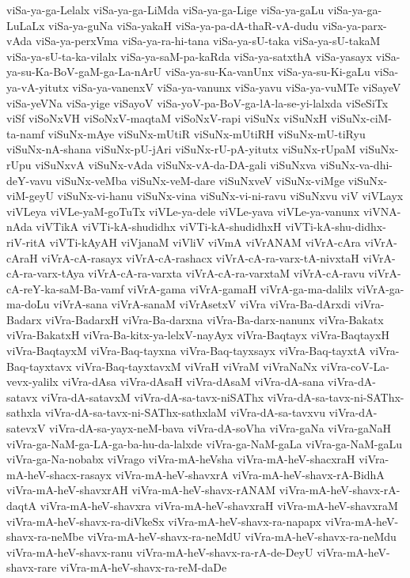 {viSa-ya-ga-Lelalx
viSa-ya-ga-LiMda
viSa-ya-ga-Lige
viSa-ya-gaLu
viSa-ya-ga-LuLaLx
viSa-ya-guNa
viSa-yakaH
viSa-ya-pa-dA-thaR-vA-dudu
viSa-ya-parx-vAda
viSa-ya-perxVma
viSa-ya-ra-hi-tana
viSa-ya-sU-taka
viSa-ya-sU-takaM
viSa-ya-sU-ta-ka-vilalx
viSa-ya-saM-pa-kaRda
viSa-ya-satxthA
viSa-yasayx
viSa-ya-su-Ka-BoV-gaM-ga-La-nArU
viSa-ya-su-Ka-vanUnx
viSa-ya-su-Ki-gaLu
viSa-ya-vA-yitutx
viSa-ya-vanenxV
viSa-ya-vanunx
viSa-yavu
viSa-ya-vuMTe
viSayeV
viSa-yeVNa
viSa-yige
viSayoV
viSa-yoV-pa-BoV-ga-lA-la-se-yi-lalxda
viSeSiTx
viSf
viSoNxVH
viSoNxV-maqtaM
viSoNxV-rapi
viSuNx
viSuNxH
viSuNx-ciM-ta-namf
viSuNx-mAye
viSuNx-mUtiR
viSuNx-mUtiRH
viSuNx-mU-tiRyu
viSuNx-nA-shana
viSuNx-pU-jAri
viSuNx-rU-pA-yitutx
viSuNx-rUpaM
viSuNx-rUpu
viSuNxvA
viSuNx-vAda
viSuNx-vA-da-DA-gali
viSuNxva
viSuNx-va-dhi-deY-vavu
viSuNx-veMba
viSuNx-veM-dare
viSuNxveV
viSuNx-viMge
viSuNx-viM-geyU
viSuNx-vi-hanu
viSuNx-vina
viSuNx-vi-ni-ravu
viSuNxvu
viV
viVLayx
viVLeya
viVLe-yaM-goTuTx
viVLe-ya-dele
viVLe-yava
viVLe-ya-vanunx
viVNA-nAda
viVTikA
viVTi-kA-shudidhx
viVTi-kA-shudidhxH
viVTi-kA-shu-didhx-riV-ritA
viVTi-kAyAH
viVjanaM
viVliV
viVmA
viVrANAM
viVrA-cAra
viVrA-cAraH
viVrA-cA-rasayx
viVrA-cA-rashacx
viVrA-cA-ra-varx-tA-nivxtaH
viVrA-cA-ra-varx-tAya
viVrA-cA-ra-varxta
viVrA-cA-ra-varxtaM
viVrA-cA-ravu
viVrA-cA-reY-ka-saM-Ba-vamf
viVrA-gama
viVrA-gamaH
viVrA-ga-ma-dalilx
viVrA-ga-ma-doLu
viVrA-sana
viVrA-sanaM
viVrAsetxV
viVra
viVra-Ba-dArxdi
viVra-Badarx
viVra-BadarxH
viVra-Ba-darxna
viVra-Ba-darx-nanunx
viVra-Bakatx
viVra-BakatxH
viVra-Ba-kitx-ya-lelxV-nayAyx
viVra-Baqtayx
viVra-BaqtayxH
viVra-BaqtayxM
viVra-Baq-tayxna
viVra-Baq-tayxsayx
viVra-Baq-tayxtA
viVra-Baq-tayxtavx
viVra-Baq-tayxtavxM
viVraH
viVraM
viVraNaNx
viVra-coV-La-vevx-yalilx
viVra-dAsa
viVra-dAsaH
viVra-dAsaM
viVra-dA-sana
viVra-dA-satavx
viVra-dA-satavxM
viVra-dA-sa-tavx-niSAThx
viVra-dA-sa-tavx-ni-SAThx-sathxla
viVra-dA-sa-tavx-ni-SAThx-sathxlaM
viVra-dA-sa-tavxvu
viVra-dA-satevxV
viVra-dA-sa-yayx-neM-bava
viVra-dA-soVha
viVra-gaNa
viVra-gaNaH
viVra-ga-NaM-ga-LA-ga-ba-hu-da-lalxde
viVra-ga-NaM-gaLa
viVra-ga-NaM-gaLu
viVra-ga-Na-nobabx
viVrago
viVra-mA-heVsha
viVra-mA-heV-shacxraH
viVra-mA-heV-shacx-rasayx
viVra-mA-heV-shavxrA
viVra-mA-heV-shavx-rA-BidhA
viVra-mA-heV-shavxrAH
viVra-mA-heV-shavx-rANAM
viVra-mA-heV-shavx-rA-daqtA
viVra-mA-heV-shavxra
viVra-mA-heV-shavxraH
viVra-mA-heV-shavxraM
viVra-mA-heV-shavx-ra-diVkeSx
viVra-mA-heV-shavx-ra-napapx
viVra-mA-heV-shavx-ra-neMbe
viVra-mA-heV-shavx-ra-neMdU
viVra-mA-heV-shavx-ra-neMdu
viVra-mA-heV-shavx-ranu
viVra-mA-heV-shavx-ra-rA-de-DeyU
viVra-mA-heV-shavx-rare
viVra-mA-heV-shavx-ra-reM-daDe
}
